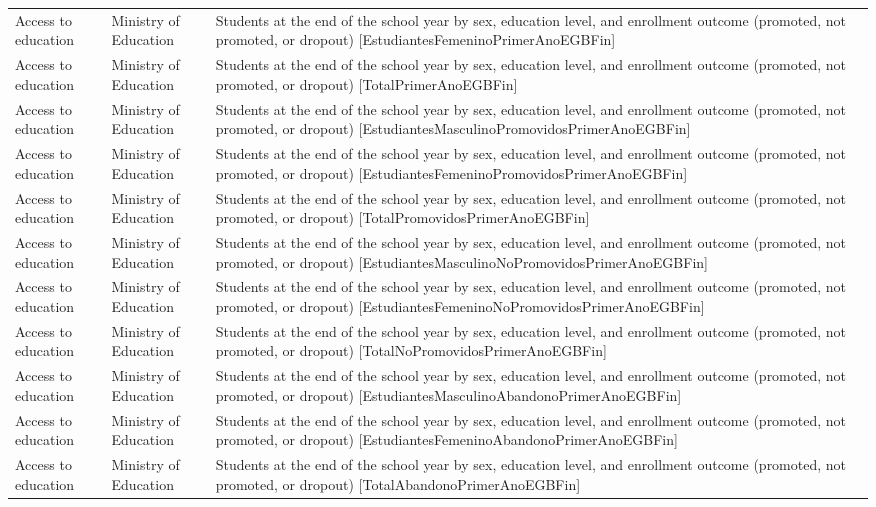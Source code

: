 \documentclass[10pt,a4paper]{article}
\begin{document}
\begin{longtable}{@{}>{\raggedright\arraybackslash}p{3.5cm}>{\raggedright\arraybackslash}p{5.6cm}>{\raggedright\arraybackslash}p{\dimexpr\textwidth-9.1cm-4\tabcolsep\relax}@{}}
Access to education & Ministry of Education & Students at the end of the school year by sex, education level, and enrollment outcome (promoted, not promoted, or dropout) [EstudiantesFemeninoPrimerAnoEGBFin]\\
Access to education & Ministry of Education & Students at the end of the school year by sex, education level, and enrollment outcome (promoted, not promoted, or dropout) [TotalPrimerAnoEGBFin]\\
Access to education & Ministry of Education & Students at the end of the school year by sex, education level, and enrollment outcome (promoted, not promoted, or dropout) [EstudiantesMasculinoPromovidosPrimerAnoEGBFin]\\
Access to education & Ministry of Education & Students at the end of the school year by sex, education level, and enrollment outcome (promoted, not promoted, or dropout) [EstudiantesFemeninoPromovidosPrimerAnoEGBFin]\\
Access to education & Ministry of Education & Students at the end of the school year by sex, education level, and enrollment outcome (promoted, not promoted, or dropout) [TotalPromovidosPrimerAnoEGBFin]\\
Access to education & Ministry of Education & Students at the end of the school year by sex, education level, and enrollment outcome (promoted, not promoted, or dropout) [EstudiantesMasculinoNoPromovidosPrimerAnoEGBFin]\\
Access to education & Ministry of Education & Students at the end of the school year by sex, education level, and enrollment outcome (promoted, not promoted, or dropout) [EstudiantesFemeninoNoPromovidosPrimerAnoEGBFin]\\
Access to education & Ministry of Education & Students at the end of the school year by sex, education level, and enrollment outcome (promoted, not promoted, or dropout) [TotalNoPromovidosPrimerAnoEGBFin]\\
Access to education & Ministry of Education & Students at the end of the school year by sex, education level, and enrollment outcome (promoted, not promoted, or dropout) [EstudiantesMasculinoAbandonoPrimerAnoEGBFin]\\
Access to education & Ministry of Education & Students at the end of the school year by sex, education level, and enrollment outcome (promoted, not promoted, or dropout) [EstudiantesFemeninoAbandonoPrimerAnoEGBFin]\\
Access to education & Ministry of Education & Students at the end of the school year by sex, education level, and enrollment outcome (promoted, not promoted, or dropout) [TotalAbandonoPrimerAnoEGBFin]\\

\end{longtable}
\end{document}
